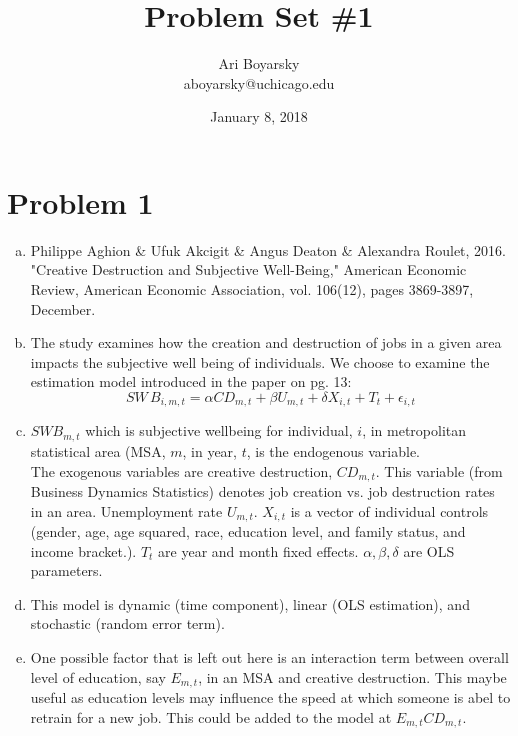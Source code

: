 \documentclass[dvips,12pt]{article}
\begin{document}

\title{Problem Set \#1}
\author{Ari Boyarsky \\ aboyarsky@uchicago.edu}
\date{January 8, 2018}


\maketitle


\section*{Problem 1}
\begin{enumerate}[a.]
	\item Philippe Aghion \& Ufuk Akcigit \& Angus Deaton \& Alexandra Roulet, 2016. "Creative Destruction and Subjective Well-Being," American Economic Review, American Economic Association, vol. 106(12), pages 3869-3897, December.

	\item The study examines how the creation and destruction of jobs in a given area impacts the subjective well being of individuals. We choose to examine the estimation model introduced in the paper on pg. 13:
	$$SW\,B_{i,m,t} = \alpha C D_{m,t} + \beta U_{m,t} + \delta X_{i,t} + T_t + \epsilon_{i,t}$$

	\item $SW B_{m,t}$ which is subjective wellbeing for individual, $i$, in metropolitan statistical area (MSA, $m$, in year, $t$, is the endogenous variable.
	\vspace{10pt} 
	\\ The exogenous variables are creative destruction, $CD_{m,t}$. This variable (from Business Dynamics Statistics) denotes job creation vs. job destruction rates in an area. Unemployment rate $U_{m,t}$. $X_{i,t}$ is a vector of individual controls (gender, age, age squared, race, education level, and family status, and income bracket.). $T_t$ are year and month fixed effects. $\alpha, \beta, \delta$ are OLS parameters.

	\item This model is dynamic (time component), linear (OLS estimation), and stochastic (random error term).

	\item One possible factor that is left out here is an interaction term between overall level of education, say $E_{m,t}$, in an MSA and creative destruction. This maybe useful as education levels may influence the speed at which someone is abel to retrain for a new job. This could be added to the model at $E_{m,t}C D_{m,t}$.
\end{enumerate}
\end{document}
